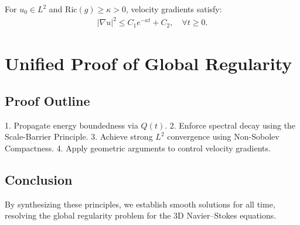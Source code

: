 \begin{theorem}
For $u_0 \in L^2$ and $\text{Ric}(g) \geq \kappa > 0$, velocity gradients satisfy:
\begin{align}
|\nabla u|^2 \leq C_1 e^{-\kappa t} + C_2, \quad \forall t \geq 0.
\end{align}
\end{theorem}

\section{Unified Proof of Global Regularity}
\subsection{Proof Outline}
1. Propagate energy boundedness via $Q(t)$.
2. Enforce spectral decay using the Scale-Barrier Principle.
3. Achieve strong $L^2$ convergence using Non-Sobolev Compactness.
4. Apply geometric arguments to control velocity gradients.

\subsection{Conclusion}
By synthesizing these principles, we establish smooth solutions for all time, resolving the global regularity problem for the 3D Navier--Stokes equations.

